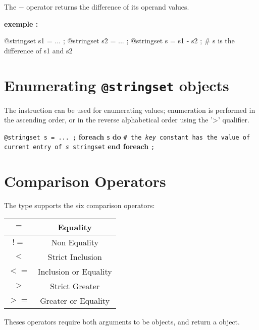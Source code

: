 The \emph{$-$} operator returns the difference of its operand values.

\textbf{exemple :}
\begin{galgascode}
@stringset s1 = ... ;
@stringset s2 = ... ;
@stringset s = s1 - s2 ; \# s is the difference of s1 and s2
\end{galgascode}








\section{Enumerating \texttt{@stringset} objects}


The  instruction can be used for enumerating  values; enumeration is performed in the ascending order, or in the reverse alphabetical order using the '>' qualifier.

\texttt{@stringset s = ... ;}\newline
\textbf{foreach} \texttt {s} \textbf {do}\newline
\texttt{\# the \emph{key} constant has the value of current entry of \emph{s} stringset}\newline
\textbf{end foreach} \texttt{;}







\section{Comparison Operators}

The  type supports the six comparison operators:\newline

\begin{tabular}{|c|c|}
\hline
$=$ & Equality \\
\hline
$!=$ & Non Equality \\
\hline
$<$  & Strict Inclusion \\
\hline
$<=$  & Inclusion or Equality \\
\hline
$>$  & Strict Greater \\
\hline
$>=$  & Greater or Equality \\
\hline
\end{tabular}

Theses operators require both arguments to be  objects, and return a  object.


